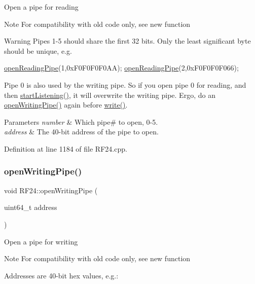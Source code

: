 Open a pipe for reading \begin{DoxyNote}{Note}
For compatibility with old code only, see new function
\end{DoxyNote}
\begin{DoxyWarning}{Warning}
Pipes 1-\/5 should share the first 32 bits. Only the least significant byte should be unique, e.\+g. 
\begin{DoxyCode}
\hyperlink{classRF24_a9edc910ccc1ffcff56814b08faca5535}{openReadingPipe}(1,0xF0F0F0F0AA);
\hyperlink{classRF24_a9edc910ccc1ffcff56814b08faca5535}{openReadingPipe}(2,0xF0F0F0F066);
\end{DoxyCode}


Pipe 0 is also used by the writing pipe. So if you open pipe 0 for reading, and then \hyperlink{classRF24_a30a2733a3889bdc331fe2d2f4f0f7b39}{start\+Listening()}, it will overwrite the writing pipe. Ergo, do an \hyperlink{classRF24_af2e409e62d49a23e372a70b904ae30e1}{open\+Writing\+Pipe()} again before \hyperlink{classRF24_a4cd4c198a47704db20b6b5cf0731cd58}{write()}.
\end{DoxyWarning}

\begin{DoxyParams}{Parameters}
{\em number} & Which pipe\# to open, 0-\/5. \\
\hline
{\em address} & The 40-\/bit address of the pipe to open. \\
\hline
\end{DoxyParams}


Definition at line 1184 of file R\+F24.\+cpp.

\mbox{\label{classRF24_a50c8e68ee840e1860a31dbdc83afbd77}} 
\subsubsection{\texorpdfstring{open\+Writing\+Pipe()}{openWritingPipe()}\hspace{0.1cm}{\footnotesize\ttfamily [2/2]}}
{\footnotesize\ttfamily void R\+F24\+::open\+Writing\+Pipe (\begin{DoxyParamCaption}\item[{uint64\+\_\+t}]{address }\end{DoxyParamCaption})}

Open a pipe for writing \begin{DoxyNote}{Note}
For compatibility with old code only, see new function
\end{DoxyNote}
Addresses are 40-\/bit hex values, e.\+g.\+:


